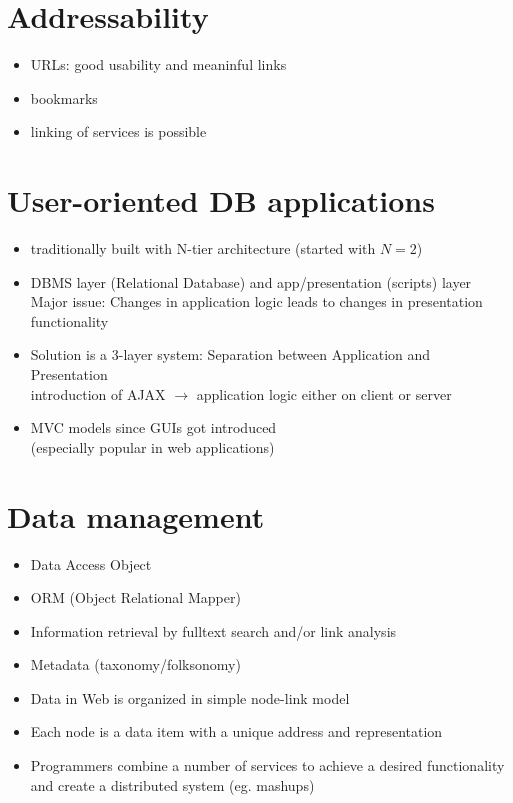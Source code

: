 \documentclass[a4paper]{report}
\begin{document}
\section{Addressability}

\begin{itemize}
  \item URLs: good usability and meaninful links
  \item bookmarks
  \item linking of services is possible
\end{itemize}

\section{User-oriented DB applications}

\begin{itemize}
  \item traditionally built with N-tier architecture (started with $N=2$)
  \item DBMS layer (Relational Database) and app/presentation (scripts) layer \\
        Major issue: Changes in application logic leads to changes in
        presentation functionality
  \item Solution is a 3-layer system:
        Separation between Application and Presentation \\
        introduction of AJAX $\rightarrow$ application logic either on
        client or server
  \item MVC models since GUIs got introduced \\
        (especially popular in web applications)
\end{itemize}

\section{Data management}

\begin{itemize}
  \item Data Access Object
  \item ORM (Object Relational Mapper)
  \item Information retrieval by fulltext search and/or link analysis
  \item Metadata (taxonomy/folksonomy)
  \item Data in Web is organized in simple node-link model
  \item Each node is a data item with a unique address and representation
  \item Programmers combine a number of services to achieve a desired
        functionality and create a distributed system (eg. mashups)
\end{itemize}
\end{document}
